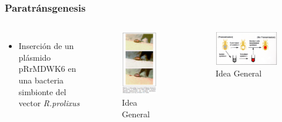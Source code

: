 \documentclass{beamer}
\begin{document}
\begin{frame}
\frametitle{Paratránsgenesis}
\begin{columns}[c] %
\begin{itemize}
\item Inserción de un plásmido pRrMDWK6 en una bacteria simbionte del vector \textit{R.prolixus}
\end{itemize}
\begin{figure}[ht!]
\includegraphics[scale=0.3]{insectos2.PNG} 
\caption{Idea General}
\end{figure} 
\begin{figure}[ht!]
\includegraphics[scale=0.55]{insectos.png} 
\caption{Idea General}
\end{figure}


\end{columns}
\end{frame}
\end{document}
